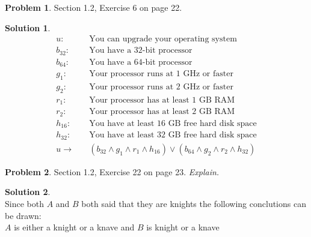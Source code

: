 \documentclass{article}
\theoremstyle{definition}
\newtheorem{problem}{Problem}
\newtheorem*{solution}{Solution}
\begin{document}
\begin{problem} Section 1.2, Exercise 6 on page 22.
\end{problem}
\begin{solution}
  \begin{align*}
  u: & \quad \text{You can upgrade your operating system} \\
  b_{32}: & \quad \text{You have a 32-bit processor} \\
  b_{64}: & \quad \text{You have a 64-bit processor} \\
  g_1:    & \quad \text{Your processor runs at 1 GHz or faster} \\
  g_2:    & \quad \text{Your processor runs at 2 GHz or faster} \\
  r_1:    & \quad \text{Your processor has at least 1 GB RAM} \\
  r_2:    & \quad \text{Your processor has at least 2 GB RAM} \\
  h_{16}: & \quad \text{You have at least 16 GB free hard disk space} \\
  h_{32}: & \quad \text{You have at least 32 GB free hard disk space} \\
  u \rightarrow & \quad (b_{32} \land g_1 \land r_1 \land h_{16}) \lor (b_{64} \land g_2 \land r_2 \land h_{32})
  \end{align*}
\end{solution}

\begin{problem} Section 1.2, Exercise 22 on page 23. \textsl{Explain.}
\end{problem}
\begin{solution} \ \\
  Since both $A$ and $B$ both said that they are knights the following conclutions can be drawn: \\
  $A$ is either a knight or a knave and $B$ is knight or a knave
\end{solution}
\end{document}
